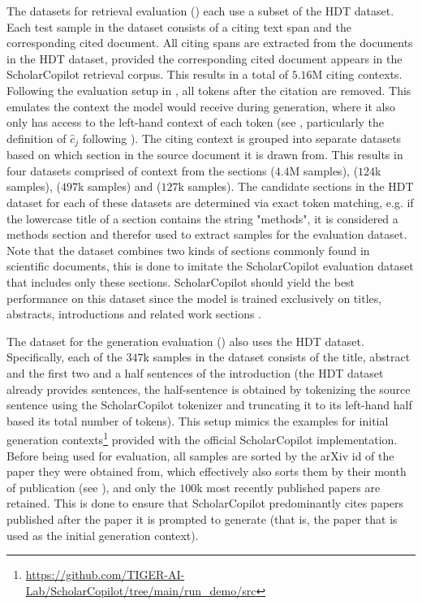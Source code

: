 The datasets for retrieval evaluation () each use a subset of the HDT dataset. Each test sample in the dataset consists of a citing text span and the corresponding cited document. All citing spans are extracted from the documents in the HDT dataset, provided the corresponding cited document appears in the ScholarCopilot retrieval corpus. This results in a total of $5.16$M citing contexts. Following the evaluation setup in \cite{wang2025scholarcopilot}, all tokens after the citation are removed. This emulates the context the model would receive during generation, where it also only has access to the left-hand context of each \mono{[RET]} token (see , particularly the definition of $\hat{c}_j$ following ). The citing context is grouped into separate datasets based on which section in the source document it is drawn from. This results in four datasets comprised of context from the sections  ($4.4$M samples),  ($124$k samples),  ($497$k samples) and  ($127$k samples). The candidate sections in the HDT dataset for each of these datasets are determined via exact token matching, e.g. if the lowercase title of a section contains the string "methods", it is considered a methods section and therefor used to extract samples for the  evaluation dataset. Note that the dataset  combines two kinds of sections commonly found in scientific documents, this is done to imitate the ScholarCopilot evaluation dataset that includes only these sections. ScholarCopilot should yield the best performance on this dataset since the model is trained exclusively on titles, abstracts, introductions and related work sections \cite{wang2025scholarcopilot}. 

The dataset for the generation evaluation () also uses the HDT dataset. Specifically, each of the $347$k samples in the dataset consists of the title, abstract and the first two and a half sentences of the introduction (the HDT dataset already provides sentences, the half-sentence is obtained by tokenizing the source sentence using the ScholarCopilot tokenizer and truncating it to its left-hand half based its total number of tokens). This setup mimics the examples for initial generation contexts\footnote{\url{https://github.com/TIGER-AI-Lab/ScholarCopilot/tree/main/run_demo/src}} provided with the official ScholarCopilot implementation. Before being used for evaluation, all samples are sorted by the arXiv id of the paper they were obtained from, which effectively also sorts them by their month of publication (see \cite{arxivstaff2025arxivid}), and only the $100$k most recently published papers are retained. This is done to ensure that ScholarCopilot predominantly cites papers published after the paper it is prompted to generate (that is, the paper that is used as the initial generation context).

